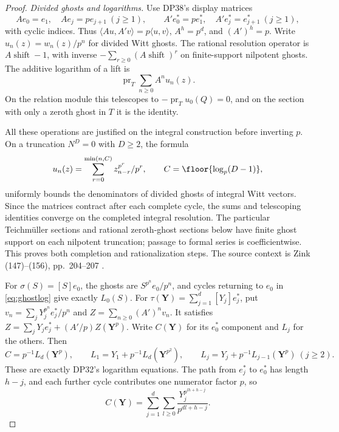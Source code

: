 \documentclass[11pt,a4paper]{article}
\theoremstyle{definition}\newtheorem{remark}[theorem]{Remark}
\begin{document}
\begin{proof}
\emph{Divided ghosts and logarithms.}
Use DP38's display matrices
\[
 Ae_0=e_1,\quad Ae_j=pe_{j+1}\ (j\ge1),\qquad
 A'e_0^*=pe_1^*,\quad A'e_j^*=e_{j+1}^*\ (j\ge1),
\]
with cyclic indices. Thus $\langle Au,A'v\rangle=p\langle u,v\rangle$,
$A^h=p^d$, and $(A')^h=p$. Write $u_n(z)=w_n(z)/p^n$ for divided Witt ghosts. The rational resolution operator is $A\operatorname{shift}-1$, with inverse
$-\sum_{r\ge0}(A\operatorname{shift})^r$ on finite-support nilpotent ghosts. The additive logarithm of a lift is
\begin{equation}\label{eq:ghostlog}
 \operatorname{pr}_T\sum_{n\ge0}A^nu_n(z).
\end{equation}
On the relation module this telescopes to $-\operatorname{pr}_Tu_0(Q)=0$, and on the section with only a zeroth ghost in $T$ it is the identity.

All these operations are justified on the integral construction before inverting $p$. On a truncation $N^D=0$ with $D\ge2$, the formula
\[
 u_n(z)=\sum_{r=0}^{\min(n,C)}
              z_{n-r}^{p^r}/p^r,\qquad C=\floor{\log_p(D-1)},
\]
uniformly bounds the denominators of divided ghosts of integral Witt vectors. Since the matrices contract after each complete cycle, the sums and telescoping identities converge on the completed integral resolution. The particular Teichm\"uller sections and rational zeroth-ghost sections below have finite ghost support on each nilpotent truncation; passage to formal series is coefficientwise. This proves both completion and rationalization steps. The source context is Zink (147)--(156), pp.~204--207 \cite{Zink}.

For $\sigma(S)=[S]e_0$, the ghosts are $S^{p^n}e_0/p^n$, and cycles returning to $e_0$ in \eqref{eq:ghostlog} give exactly $L_0(S)$. For $\tau(\mathbf Y)=\sum_{j=1}^d[Y_j]e_j^*$, put
$v_n=\sum_jY_j^{p^n}e_j^*/p^n$ and
$Z=\sum_{n\ge0}(A')^nv_n$. It satisfies
$Z=\sum_jY_je_j^*+(A'/p)Z(\mathbf Y^p)$.
Write $C(\mathbf Y)$ for its $e_0^*$ component and $L_j$ for the others. Then
\[
 C=p^{-1}L_d(\mathbf Y^p),\qquad
 L_1=Y_1+p^{-1}L_d(\mathbf Y^{p^2}),\qquad
 L_j=Y_j+p^{-1}L_{j-1}(\mathbf Y^p)\ (j\ge2).
\]
These are exactly DP32's logarithm equations. The path from $e_j^*$ to $e_0^*$ has length $h-j$, and each further cycle contributes one numerator factor $p$, so
\[
 C(\mathbf Y)=\sum_{j=1}^d\sum_{l\ge0}
                \frac{Y_j^{p^{lh+h-j}}}{p^{dl+h-j}}.
\]


\end{proof}
\end{document}

